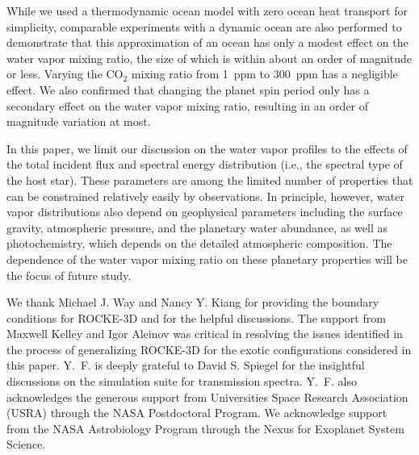 \documentclass[11pt,numberedappendix,twocolappendix,]{emulateapj}
\def\modelE{ROCKE-3D}
\def\wv{water vapor}
\begin{document}
While we used a thermodynamic ocean model with zero ocean heat transport for simplicity, comparable experiments with a dynamic ocean are also performed to demonstrate that this approximation of an ocean has only a modest effect on the \wv{} mixing ratio, the size of which is within about an order of magnitude or less. 
Varying the CO$_2$ mixing ratio from 1~ppm to 300~ppm has a negligible effect. 
We also confirmed that changing the planet spin period only has a secondary effect on the \wv{} mixing ratio, resulting in an order of magnitude variation at most. 


In this paper, we limit our discussion on the \wv{} profiles to the effects of the total incident flux and spectral energy distribution (i.e., the spectral type of the host star). 
These parameters are among the limited number of properties that can be constrained relatively easily by observations. 
In principle, however, \wv{} distributions also depend on geophysical parameters including the surface gravity, atmospheric pressure, and the planetary water abundance, as well as photochemistry, which depends on the detailed atmospheric composition. 
The dependence of the \wv{} mixing ratio on these planetary properties will be  the focus of future study. 





\acknowledgments
We thank Michael J. Way and Nancy Y. Kiang for providing the boundary conditions for \modelE{} and for the helpful discussions. 
The support from Maxwell Kelley and Igor Aleinov was critical in resolving the issues identified in the process of generalizing \modelE{} for the exotic configurations considered in this paper. 
Y.~F. is deeply grateful to David S. Spiegel for the insightful discussions on the simulation suite for transmission spectra. 
Y.~F. also acknowledges the generous support from Universities Space Research Association (USRA) through the NASA Postdoctoral Program. 
We acknowledge support from the NASA Astrobiology Program through the Nexus for Exoplanet System Science.




\appendix


\end{document}
